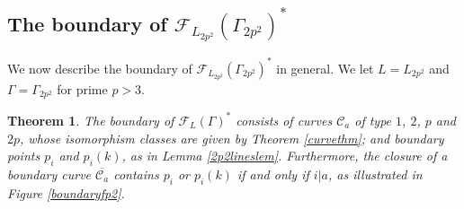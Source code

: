 \documentclass[11pt]{article}
\newtheorem{thm}{Theorem}[section]
\newcommand{\cc}{\mathcal{C}}
\newcommand{\fc}{\mathcal{F}}
\begin{document}
\subsection{The boundary of $\fc_{L_{2p^2}}(\Gamma_{2p^2})^*$}
We now describe the boundary of $\fc_{L_{2p^2}}(\Gamma_{2p^2})^*$ in general.
We let $L=L_{2p^2}$ and $\Gamma=\Gamma_{2p^2}$ for prime $p>3$.
\begin{thm}\label{2p2curvethm}
The boundary of $\fc_L(\Gamma)^*$ consists of curves $\cc_a$ of type $1$, $2$, $p$ and $2p$, whose isomorphism classes are given by Theorem \ref{curvethm}; and boundary points $p_i$ and $p_i(k)$, as in Lemma \ref{2p2lineslem}.
    Furthermore, the closure of a boundary curve $\overline{\cc_a}$ contains $p_i$ or $p_i(k)$ if and only if $i \vert a$, as illustrated in Figure \ref{boundaryfp2}. \end{thm}
\end{document}
